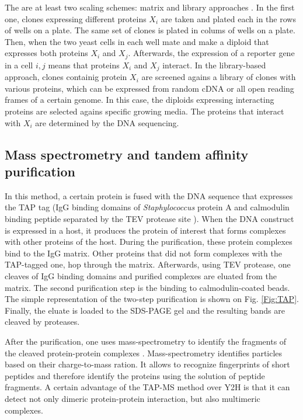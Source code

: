 The are at least two scaling schemes: matrix and library approaches \cite{uetz2000comprehensive,ito2001comprehensive}. In the first one, 
clones expressing different proteins ${X_i}$ are taken and plated each
in the rows of wells on a plate. The same set of clones is plated in colums of wells on a plate. Then, when the two yeast cells in each well mate and make a diploid that
expresses both proteins $X_i$ and $X_j$. Afterwards, the expression of a reporter gene in a cell $i,j$ means that proteins $X_i$ and $X_j$ interact.
In the library-based approach, clones containig protein $X_i$ are screened agains a library of clones with various proteins, which can be expressed from
random cDNA or all open reading frames of a certain genome. In this case, the diploids expressing interacting proteins are selected agains specific growing media.
The proteins that interact with $X_i$ are determined by the DNA sequencing.

\subsection{Mass spectrometry and tandem affinity purification}
In this method, a certain protein is fused with the DNA sequence that expresses the TAP tag (IgG binding domains of \emph{Staphylococcus} protein A and calmodulin
binding peptide separated by the TEV protease site \cite{puig2001tandem}). When the DNA construct is expressed in a host, it produces the protein of interest that forms complexes
with other proteins of the host. During the purification, these protein complexes bind to the IgG matrix. Other proteins that did not form complexes with
the TAP-tagged one, hop through the matrix. Afterwards, using TEV protease, one cleaves of IgG binding domains and purified complexes are eluated from the matrix.
The second purification step is the binding to calmodulin-coated beads. The simple representation of the two-step purification is shown on Fig. \ref{Fig:TAP}.
Finally, the eluate is loaded to the SDS-PAGE gel and the resulting bands are cleaved by proteases.

After the purification, one uses mass-spectrometry to identify the fragments of the cleaved protein-protein complexes \cite{di2005molecular}. Mass-spectrometry identifies particles 
based on their charge-to-mass ration. It allows to recognize fingerprints of short peptides and therefore identify the proteins using the solution of 
peptide fragments.
A certain advantage of the TAP-MS method over Y2H is that it can detect not only dimeric protein-protein interaction, but also multimeric complexes.

